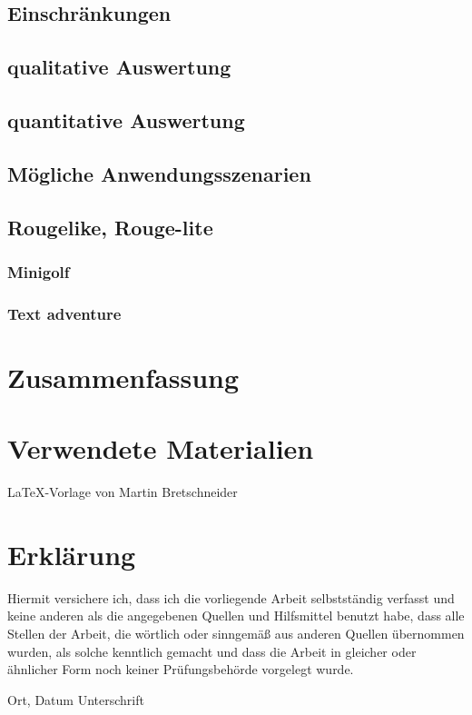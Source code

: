 \section{Einschränkungen}


\section{qualitative Auswertung}

\section{quantitative Auswertung}

\section{Mögliche Anwendungsszenarien}

\section{Rougelike, Rouge-lite}

\subsection{Minigolf}

\subsection{Text adventure}


\chapter{Zusammenfassung}\label{c.zusammenfassung}


\chapter*{Verwendete Materialien}
\LaTeX -Vorlage von Martin Bretschneider \cite{thesislatex}




\chapter*{Erklärung}

Hiermit versichere ich, dass ich die vorliegende Arbeit selbstständig verfasst und keine anderen als die angegebenen Quellen und Hilfsmittel benutzt habe, dass alle Stellen der Arbeit, die wörtlich oder sinngemäß aus anderen Quellen übernommen wurden, als solche kenntlich gemacht und dass die Arbeit in gleicher oder ähnlicher Form noch keiner Prüfungsbehörde vorgelegt wurde.

\vspace{3cm}
Ort, Datum \hspace{5cm} Unterschrift \\

